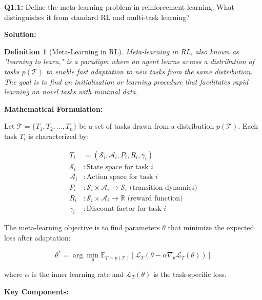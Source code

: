 \documentclass[12pt]{article}
\newcommand{\ieee}[1]{\textcolor{IEEEBlue}{\textbf{#1}}}
\newtheorem{definition}{Definition}
\begin{document}
{{			\textbf{Q1.1:} Define the meta-learning problem in reinforcement learning. What distinguishes it from standard RL and multi-task learning?
			
			\textbf{Solution:}
			
			\begin{definition}[Meta-Learning in RL]
			Meta-learning in RL, also known as "learning to learn," is a paradigm where an agent learns across a distribution of tasks $p(\mathcal{T})$ to enable fast adaptation to new tasks from the same distribution. The goal is to find an initialization or learning procedure that facilitates rapid learning on novel tasks with minimal data.
			\end{definition}
			
			\ieee{Mathematical Formulation:}
			
			Let $\mathcal{T} = \{T_1, T_2, \ldots, T_n\}$ be a set of tasks drawn from a distribution $p(\mathcal{T})$. Each task $T_i$ is characterized by:
			
			\begin{align}
			T_i &= (\mathcal{S}_i, \mathcal{A}_i, P_i, R_i, \gamma_i) \\
			\mathcal{S}_i &: \text{State space for task } i \\
			\mathcal{A}_i &: \text{Action space for task } i \\
			P_i &: \mathcal{S}_i \times \mathcal{A}_i \rightarrow \mathcal{S}_i \text{ (transition dynamics)} \\
			R_i &: \mathcal{S}_i \times \mathcal{A}_i \rightarrow \mathbb{R} \text{ (reward function)} \\
			\gamma_i &: \text{Discount factor for task } i
			\end{align}
			
			The meta-learning objective is to find parameters $\theta$ that minimize the expected loss after adaptation:
			
			\begin{equation}
			\theta^* = \arg\min_\theta \mathbb{E}_{T \sim p(\mathcal{T})} \left[ \mathcal{L}_T(\theta - \alpha \nabla_\theta \mathcal{L}_T(\theta)) \right]
			\end{equation}
			
			where $\alpha$ is the inner learning rate and $\mathcal{L}_T(\theta)$ is the task-specific loss.
			
			\ieee{Key Components:}
			
}}
\end{document}
